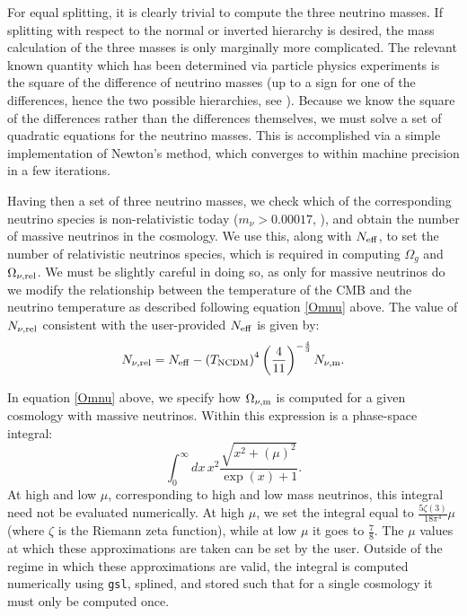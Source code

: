 \documentclass[\docopts]{\docclass}
\begin{document}
For equal splitting, it is clearly trivial to compute the three neutrino masses. If splitting with respect to the normal or inverted hierarchy is desired, the mass calculation of the three masses is only marginally more complicated. The relevant known quantity which has been determined via particle physics experiments is the square of the difference of neutrino masses (up to a sign for one of the differences, hence the two possible hierarchies, see \cite{Lesgourgues2012, Gerbino2017}). Because we know the square of the differences rather than the differences themselves, we must solve a set of quadratic equations for the neutrino masses. This is accomplished via a simple implementation of Newton's method, which converges to within machine precision in a few iterations.

Having then a set of three neutrino masses, we check which of the corresponding neutrino species is non-relativistic today ($m_\nu>0.00017$, \citealt{Lesgourgues2012}), and obtain the number of massive neutrinos in the cosmology. We use this, along with $N_{\rm eff}$, to set the number of relativistic neutrinos species, which is required in computing $\Omega_g$ and $\Omega_{\nu, {\rm rel}}$. We must be slightly careful in doing so, as only for massive neutrinos do we modify the relationship between the temperature of the CMB and the neutrino temperature as described following equation \ref{Omnu} above. The value of $N_{\nu, {\rm rel}}$ consistent with the user-provided $N_{\rm eff}$ is given by:
\begin{equation}
N_{\nu, {\rm rel}} = N_{\rm eff} - \left(T_{\rm NCDM}\right)^{4} \left(\frac{4}{11}\right)^{-\frac{4}{3}} N_{\nu, {\rm m}}.
\label{Nnurel}
\end{equation}

In equation \ref{Omnu} above, we specify how $\Omega_{\nu, {\rm m}}$ is computed for a given cosmology with massive neutrinos. Within this expression is a phase-space integral:
\begin{equation}
\int_0^{\infty} dx \, x^2 \frac{\sqrt{x^2 + \left(\mu\right)^2}}{\exp(x) + 1}.
\label{phasespacenu}
\end{equation}
At high and low $\mu$, corresponding to high and low mass neutrinos, this integral need not be evaluated numerically. At high $\mu$, we set the integral equal to $\frac{5\zeta(3)}{18\pi^4}\mu$ (where $\zeta$ is the Riemann zeta function), while at low $\mu$ it goes to $\frac{7}{8}$. The $\mu$ values at which these approximations are taken can be set by the user. Outside of the regime in which these approximations are valid, the integral is computed numerically using {\tt gsl}, splined, and stored such that for a single cosmology it must only be computed once.
\end{document}
